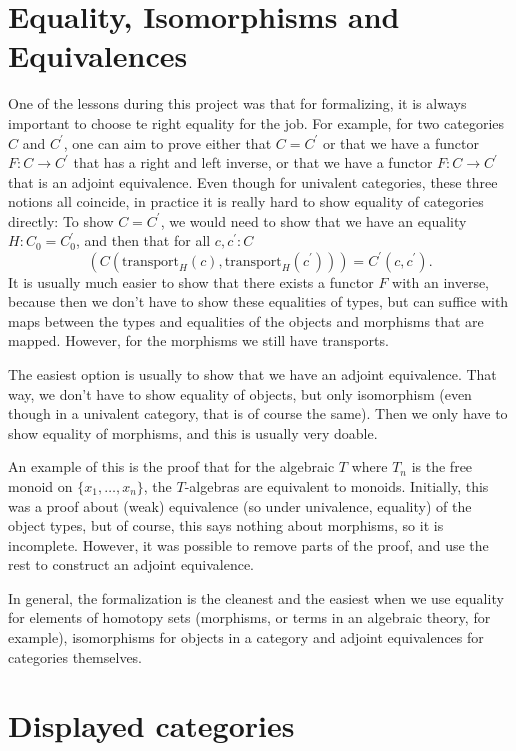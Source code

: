 \section{Equality, Isomorphisms and Equivalences}
One of the lessons during this project was that for formalizing, it is always important to choose te right equality for the job. For example, for two categories $ C $ and $ C^\prime $, one can aim to prove either that $ C = C^\prime $ or that we have a functor $ F : C \to C^\prime $ that has a right and left inverse, or that we have a functor $ F : C \to C^\prime $ that is an adjoint equivalence. Even though for univalent categories, these three notions all coincide, in practice it is really hard to show equality of categories directly: To show $ C = C^\prime $, we would need to show that we have an equality $ H : C_0 = C_0^\prime $, and then that for all $ c, c^\prime : C $
\[ (C(\mathrm{transport}_H(c), \mathrm{transport}_H(c^\prime))) = C^\prime(c, c^\prime). \]
It is usually much easier to show that there exists a functor $ F $ with an inverse, because then we don't have to show these equalities of types, but can suffice with maps between the types and equalities of the objects and morphisms that are mapped. However, for the morphisms we still have transports.

The easiest option is usually to show that we have an adjoint equivalence. That way, we don't have to show equality of objects, but only isomorphism (even though in a univalent category, that is of course the same). Then we only have to show equality of morphisms, and this is usually very doable.

An example of this is the proof that for the algebraic $ T $ where $ T_n $ is the free monoid on $ \{ x_1, \dots, x_n \} $, the $ T $-algebras are equivalent to monoids. Initially, this was a proof about (weak) equivalence (so under univalence, equality) of the object types, but of course, this says nothing about morphisms, so it is incomplete. However, it was possible to remove parts of the proof, and use the rest to construct an adjoint equivalence.

In general, the formalization is the cleanest and the easiest when we use equality for elements of homotopy sets (morphisms, or terms in an algebraic theory, for example), isomorphisms for objects in a category and adjoint equivalences for categories themselves.

\section{Displayed categories}\label{sec:displayed-categories}

